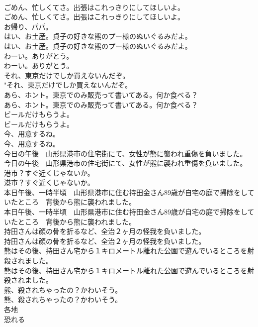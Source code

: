 \documentclass[8pt]{extreport}
\begin{document}
\begin{CJK}{UTF8}{min}
\\	ごめん、忙しくてさ。出張はこれっきりにしてほしいよ。	
\\	ごめん、忙しくてさ。出張はこれっきりにしてほしいよ。 
\\	お帰り、パパ。 
\\	はい、お土産。貞子の好きな熊のプー様のぬいぐるみだよ。	
\\	はい、お土産。貞子の好きな熊のプー様のぬいぐるみだよ。 
\\	わーい。ありがとう。	
\\	わーい。ありがとう。 
\\	それ、東京だけでしか買えないんだぞ。	
\\	"それ、東京だけでしか買えないんだぞ。 
\\	あら、ホント。東京でのみ販売って書いてある。何か食べる？	
\\	あら、ホント。東京でのみ販売って書いてある。何か食べる？ 
\\	ビールだけもらうよ。	
\\	ビールだけもらうよ。 
\\	今、用意するね。	
\\	今、用意するね。 
\\	今日の午後　山形県港市の住宅街にて、女性が熊に襲われ重傷を負いました。	
\\	今日の午後　山形県港市の住宅街にて、女性が熊に襲われ重傷を負いました。 
\\	港市？すぐ近くじゃないか。	
\\	港市？すぐ近くじゃないか。 
\\	本日午後、一時半頃　山形県港市に住む持田金さん89歳が自宅の庭で掃除をしていたところ　背後から熊に襲われました。	
\\	本日午後、一時半頃　山形県港市に住む持田金さん89歳が自宅の庭で掃除をしていたところ　背後から熊に襲われました。 
\\	持田さんは顔の骨を折るなど、全治２ヶ月の怪我を負いました。	
\\	持田さんは顔の骨を折るなど、全治２ヶ月の怪我を負いました。 
\\	熊はその後、持田さん宅から１キロメートル離れた公園で遊んでいるところを射殺されました。	
\\	熊はその後、持田さん宅から１キロメートル離れた公園で遊んでいるところを射殺されました。 
\\	熊、殺されちゃったの？かわいそう。	
\\	熊、殺されちゃったの？かわいそう。 
\\	各地
\\	恐れる

\end{CJK}
\end{document}
